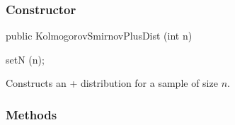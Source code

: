 \subsubsection* {Constructor}

\begin{code}

   public KolmogorovSmirnovPlusDist (int n)\begin{hide} {
      setN (n);
   }\end{hide}
\end{code}
\begin{tabb}
   Constructs an \ks+{} distribution for a sample of size $n$.
\end{tabb}

\subsubsection* {Methods}


